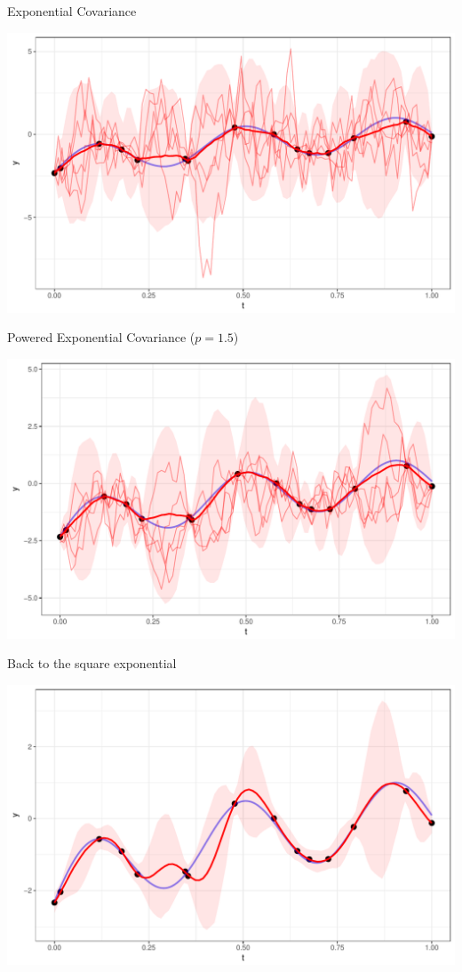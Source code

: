 \documentclass[11pt,ignorenonframetext,]{beamer}
\begin{document}
\begin{frame}{Exponential Covariance}

\includegraphics{Lec12_files/figure-beamer/unnamed-chunk-11-1.pdf}

\end{frame}

\begin{frame}{Powered Exponential Covariance (\(p=1.5\))}

\includegraphics{Lec12_files/figure-beamer/unnamed-chunk-12-1.pdf}

\end{frame}

\begin{frame}{Back to the square exponential}

\includegraphics{Lec12_files/figure-beamer/unnamed-chunk-13-1.pdf}

\end{frame}
\end{document}
